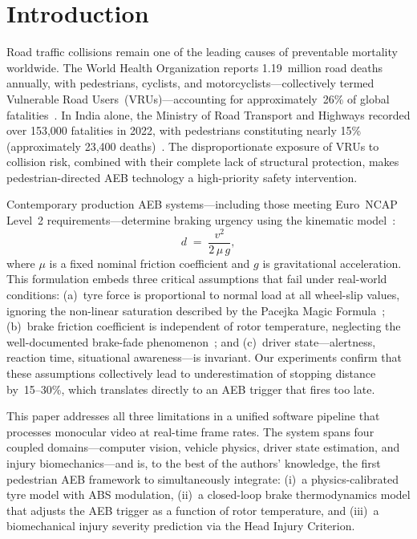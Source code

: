\documentclass[journal]{IEEEtran}
\begin{document}
\section{Introduction}
\label{sec:intro}

Road traffic collisions remain one of the leading causes of preventable
mortality worldwide.
The World Health Organization reports 1.19~million road deaths annually,
with pedestrians, cyclists, and motorcyclists---collectively termed
Vulnerable Road Users~(VRUs)---accounting for approximately~26\% of
global fatalities~\cite{who2023}.
In India alone, the Ministry of Road Transport and Highways recorded over
153,000 fatalities in 2022, with pedestrians constituting nearly 15\%
(approximately 23,400 deaths)~\cite{morth2023}.
The disproportionate exposure of VRUs to collision risk, combined with
their complete lack of structural protection, makes pedestrian-directed
AEB technology a high-priority safety intervention.

Contemporary production AEB systems---including those meeting Euro~NCAP
Level~2 requirements---determine braking urgency using the kinematic
model~\cite{seiniger2012}:
\begin{equation}
  d \;=\; \frac{v^{2}}{2\,\mu\,g},
  \label{eq:kinematic}
\end{equation}
where $\mu$ is a fixed nominal friction coefficient and $g$ is
gravitational acceleration.
This formulation embeds three critical assumptions that fail under
real-world conditions:
(a)~tyre force is proportional to normal load at all wheel-slip values,
ignoring the non-linear saturation described by the Pacejka Magic
Formula~\cite{pacejka1992};
(b)~brake friction coefficient is independent of rotor temperature,
neglecting the well-documented brake-fade phenomenon~\cite{day2014}; and
(c)~driver state---alertness, reaction time, situational
awareness---is invariant.
Our experiments confirm that these assumptions collectively lead to
underestimation of stopping distance by~15--30\%, which translates
directly to an AEB trigger that fires too late.

This paper addresses all three limitations in a unified software
pipeline that processes monocular video at real-time frame rates.
The system spans four coupled domains---computer vision, vehicle physics,
driver state estimation, and injury biomechanics---and is, to the best
of the authors' knowledge, the first pedestrian AEB framework to
simultaneously integrate:
(i)~a physics-calibrated tyre model with ABS modulation,
(ii)~a closed-loop brake thermodynamics model that adjusts the AEB
trigger as a function of rotor temperature, and
(iii)~a biomechanical injury severity prediction via the Head Injury
Criterion.
\end{document}
